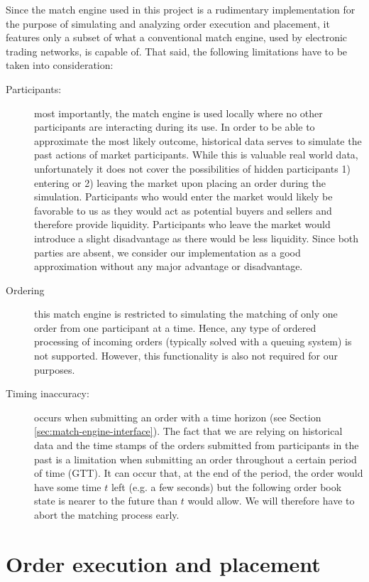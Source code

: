 Since the match engine used in this project is a rudimentary implementation for the purpose of simulating and analyzing order execution and placement, it features only a subset of what a conventional match engine, used by electronic trading networks, is capable of.
That said, the following limitations have to be taken into consideration:
\begin{description}
    \item[Participants:] most importantly, the match engine is used locally where no other participants are interacting during its use.
    In order to be able to approximate the most likely outcome, historical data serves to simulate the past actions of market participants.
    While this is valuable real world data, unfortunately it does not cover the possibilities of hidden participants 1) entering or 2) leaving the market upon placing an order during the simulation.
    Participants who would enter the market would likely be favorable to us as they would act as potential buyers and sellers and therefore provide liquidity.
    Participants who leave the market would introduce a slight disadvantage as there would be less liquidity.
    Since both parties are absent, we consider our implementation as a good approximation without any major advantage or disadvantage.
    \item[Ordering] this match engine is restricted to simulating the matching of only one order from one participant at a time.
    Hence, any type of ordered processing of incoming orders (typically solved with a queuing system) is not supported.
    However, this functionality is also not required for our purposes.
    \item[Timing inaccuracy:] occurs when submitting an order with a time horizon (see Section \ref{sec:match-engine-interface}).
    The fact that we are relying on historical data and the time stamps of the orders submitted from participants in the past is a limitation when submitting an order throughout a certain period of time (GTT).
    It can occur that, at the end of the period, the order would have some time $t$ left (e.g. a few seconds) but the following order book state is nearer to the future than $t$ would allow.
    We will therefore have to abort the matching process early.
\end{description}

\section{Order execution and placement}
\label{sec:execution-placement}

